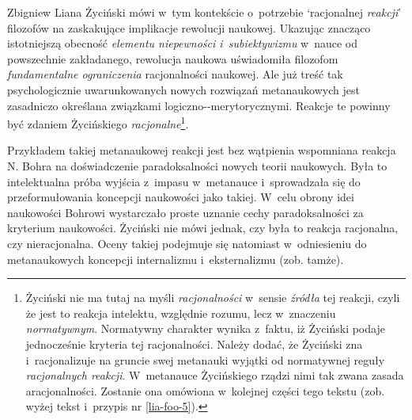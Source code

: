 \begin{artplenv}{Zbigniew Liana}
Życiński mówi w~tym kontekście o~potrzebie `racjonalnej \textit{reakcji}' filozofów
\parencites[s.~143]{zycinski_structure_1988}[s.~254; podkreślenie moje]{zycinski_struktura_2013}
na zaskakujące implikacje rewolucji naukowej. Ukazując znacząco
istotniejszą obecność \textit{elementu niepewności i~subiektywizmu} w~nauce od powszechnie zakładanego, rewolucja naukowa
uświadomiła filozofom \textit{fundamentalne ograniczenia} racjonalności naukowej. Ale już treść tak psychologicznie
uwarunkowanych nowych rozwiązań metanaukowych jest zasadniczo określana związkami
logiczno-\mbox{-merytorycznymi.} %
Reakcje te
powinny być zdaniem Życińskiego \textit{racjonalne}\footnote{Życiński nie ma tutaj na myśli \textit{racjonalności} w~sensie
\textit{źródła} tej reakcji, czyli że jest to reakcja intelektu, względnie rozumu, lecz w~znaczeniu \textit{normatywnym}.
Normatywny charakter wynika z~faktu, iż Życiński podaje jednocześnie kryteria tej racjonalności. Należy dodać, że
Życiński zna i~racjonalizuje na gruncie swej metanauki wyjątki od normatywnej reguły \textit{racjonalnych reakcji}. W~metanauce
Życińskiego rządzi nimi tak zwana zasada aracjonalności. Zostanie ona omówiona w~kolejnej części tego tekstu
(zob. wyżej tekst i~przypis nr \ref{lia-foo-5}).}.

Przykładem takiej metanaukowej reakcji jest bez wątpienia wspomniana reakcja N. Bohra na doświadczenie paradoksalności
nowych teorii naukowych. Była to intelektualna próba wyjścia z~impasu w~metanauce i~sprowadzała się do przeformułowania
koncepcji naukowości jako takiej. W~celu obrony idei naukowości Bohrowi wystarczało proste uznanie cechy
paradoksalności za kryterium naukowości. Życiński nie mówi jednak, czy była to reakcja racjonalna, czy nieracjonalna.
Oceny takiej podejmuje się natomiast w~odniesieniu do metanaukowych koncepcji internalizmu i~eksternalizmu (zob.
tamże).


\end{artplenv}

